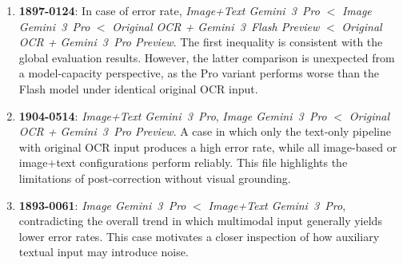 \begin{enumerate}
    \item \textbf{1897-0124}: In case of error rate,
    \textit{Image+Text Gemini~3~Pro} $<$ \textit{Image Gemini~3~Pro} $<$ \textit{Original OCR + Gemini~3~Flash Preview} $<$ \textit{Original OCR + Gemini~3~Pro Preview}.  
    The first inequality is consistent with the global evaluation results. However, the latter comparison is unexpected from a model-capacity perspective, as the Pro variant performs worse than the Flash model under identical original OCR input.


    \item \textbf{1904-0514}: \textit{Image+Text Gemini~3~Pro}, \textit{Image Gemini~3~Pro} $<$ \textit{Original OCR + Gemini~3~Pro Preview}. 
    A case in which only the text-only pipeline with original OCR input produces a high error rate, while all image-based or image+text configurations perform reliably. This file highlights the limitations of post-correction without visual grounding.

    \item \textbf{1893-0061}: 
    \textit{Image Gemini~3~Pro} $<$ \textit{Image+Text Gemini~3~Pro}, contradicting the overall trend in which multimodal input generally yields lower error rates. This case motivates a closer inspection of how auxiliary textual input may introduce noise.
\end{enumerate}



